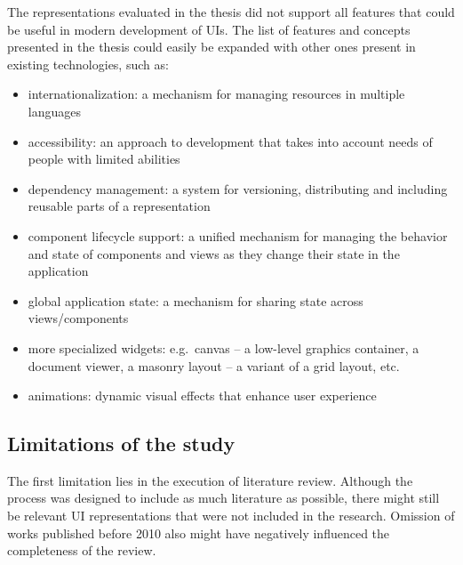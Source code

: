 The representations evaluated in the thesis did not support all features that could be useful in modern development of UIs.
The list of features and concepts presented in the thesis could easily be expanded with other ones present in existing technologies, such as:
\begin{itemize}
    \item internationalization: a mechanism for managing resources in multiple languages
    \item accessibility: an approach to development that takes into account needs of people with limited abilities
    \item dependency management: a system for versioning, distributing and including reusable parts of a representation
    \item component lifecycle support: a unified mechanism for managing the behavior and state of components and views as they change their state in the application
    \item global application state: a mechanism for sharing state across views/components
    \item more specialized widgets: e.g.\ canvas -- a low-level graphics container, a document viewer, a masonry layout -- a variant of a grid layout, etc.
    \item animations: dynamic visual effects that enhance user experience
\end{itemize}

\subsection{Limitations of the study}\label{subsec:limitations-of-the-study}

The first limitation lies in the execution of literature review.
Although the process was designed to include as much literature as possible, there might still be relevant UI representations that were not included in the research.
Omission of works published before 2010 also might have negatively influenced the completeness of the review.

